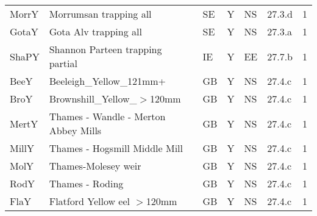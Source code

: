 \begin{table}[htbp]
\begin{tabularx}{\textwidth}{p{1.3cm}p{6.5cm}p{1cm}p{1cm}p{1cm}p{1cm}p{1.4cm}}
  MorrY & Morrumsan  trapping all & SE & Y & NS & 27.3.d &   1 \\ 
  GotaY & Gota Alv  trapping all & SE & Y & NS & 27.3.a &   1 \\ 
  ShaPY & Shannon Parteen trapping partial & IE & Y & EE & 27.7.b &   1 \\ 
  BeeY & Beeleigh\_Yellow\_121mm+ & GB & Y & NS & 27.4.c &   1 \\ 
  BroY & Brownshill\_Yellow\_$>$120mm & GB & Y & NS & 27.4.c &   1 \\ 
  MertY & Thames - Wandle - Merton Abbey Mills & GB & Y & NS & 27.4.c &   1 \\ 
  MillY & Thames - Hogsmill  Middle Mill & GB & Y & NS & 27.4.c &   1 \\ 
  MolY & Thames-Molesey weir & GB & Y & NS & 27.4.c &   1 \\ 
  RodY & Thames - Roding & GB & Y & NS & 27.4.c &   1 \\ 
  FlaY & Flatford Yellow eel $>$120mm & GB & Y & NS & 27.4.c &   1 \\ 
   \hline
\end{tabularx}
\end{table}
